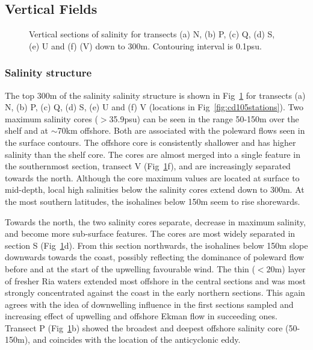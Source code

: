 \FloatBarrier
\subsection{Vertical Fields}
\begin{figure}[!th]
\centering {}%
 
 
\caption{Vertical sections of
salinity for transects (a) N, (b) P, (c) Q, (d) S, (e) U and (f)
(V) down to 300m. Contouring interval is 0.1psu. }
\label{fig:cd105_sec_S}\end{figure}
\subsubsection{Salinity structure}
The top 300m of the salinity salinity structure is shown in
Fig~\ref{fig:cd105_sec_S} for transects (a) N, (b) P, (c) Q, (d)
S, (e) U and (f) V (locations in Fig~\ref{fig:cd105stations}). Two
maximum salinity cores ($>$35.9psu) can be seen in the range
50-150m over the shelf and at $\sim$70km offshore. Both are
associated with the poleward flows seen in the surface contours.
The offshore core is consistently shallower and has higher
salinity than the shelf core. The cores are almost merged into a
single feature in the southernmost section, transect V
(Fig~\ref{fig:cd105_sec_S}f), and are increasingly separated
towards the north. Although the core maximum values are located at
surface to mid-depth, local high salinities below the salinity
cores extend down to 300m. At the most southern latitudes, the
isohalines below 150m seem to rise shorewards.

Towards the north, the two salinity cores separate, decrease in
maximum salinity, and become more sub-surface features. The cores
are most widely separated in section S
(Fig~\ref{fig:cd105_sec_S}d). From this section northwards, the
isohalines below 150m slope downwards towards the coast, possibly
reflecting the dominance of poleward flow before and at the start
of the upwelling favourable wind. The thin ($<20$m) layer of
fresher Ria waters extended most offshore in the central sections
and was most strongly concentrated against the coast in the early
northern sections. This again agrees with the idea of downwelling
influence in the first sections sampled and increasing effect of
upwelling and offshore Ekman flow in succeeding ones. Transect P
(Fig~\ref{fig:cd105_sec_S}b) showed the broadest and deepest
offshore salinity core (50-150m), and coincides with the location
of the anticyclonic eddy.

